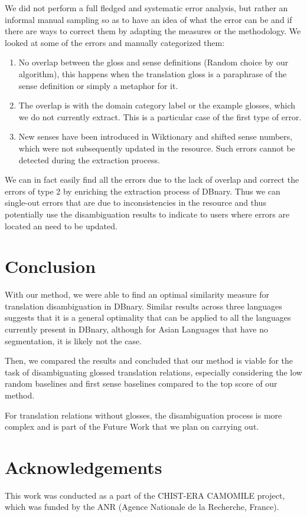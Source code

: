 \documentclass[10pt, a4paper]{article}
\begin{document}
We did not perform a full fledged and systematic error analysis, but rather an informal manual sampling so as to have an idea of what the error can be and if there are ways to correct them by adapting the measures or the methodology.
We looked at some of the errors and manually categorized them: 
\begin{enumerate}
\item No overlap between the gloss and sense definitions (Random choice by our algorithm), this happens when the translation gloss is a paraphrase of the sense definition or simply a metaphor for it.
\item The overlap is with the domain category label or the example glosses, which we do not currently extract. This is a particular case of the first type of error.
\item New senses have been introduced in Wiktionary and shifted sense numbers, which were not subsequently updated in the resource. Such errors cannot be detected during the extraction process.
\end{enumerate}

We can in fact easily find all the errors due to the lack of overlap and correct the errors of type 2 by enriching the extraction process of DBnary. Thus we can single-out errors that are due to inconsistencies in the resource and thus potentially use the disambiguation results to indicate to users where errors are located an need to be updated.

\section{Conclusion}

With our method, we were able to find an optimal similarity measure for translation disambiguation in DBnary. Similar results across three languages suggests that it is a general optimality that can be applied to all the languages currently present in DBnary, although for Asian Languages that have no segmentation, it is likely not the case.

Then, we compared the results and concluded that our method is viable for the task of disambiguating glossed translation relations, especially considering the low random baselines and first sense baselines compared to the top score of our method.

For translation relations without glosses, the disambiguation process is more complex and is part of the Future Work that we plan on carrying out.

\section{Acknowledgements}

This work was conducted as a part of the CHIST-ERA CAMOMILE project,
which was funded by the ANR (Agence Nationale de la Recherche, France).



\end{document}
